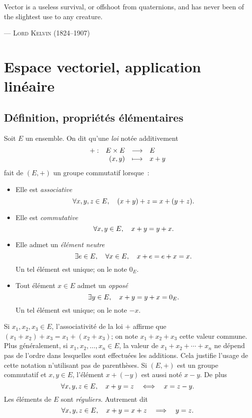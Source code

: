 \documentclass{magnoliaold}
\begin{document}
\setlength{}
\epigraph{\og Vector is a useless survival, or offshoot from quaternions, and has never been of the slightest use to any creature. \fg}{--- \textsc{Lord Kelvin (1824--1907)}}
\magtoc

\section{Espace vectoriel, application linéaire}
\subsection{Définition, propriétés élémentaires}

\begin{definition}
Soit $E$ un ensemble. On dit qu'une \emph{loi} notée additivement
\[\begin{array}[t]{lrcl} \displaystyle{+} : & \displaystyle{E\times E} & \longrightarrow & \displaystyle{E} \\ & \displaystyle{\left(x,y\right)} & \longmapsto & \displaystyle{x+y} \end{array}\]
fait de $(E,+)$ un groupe commutatif lorsque~:
\begin{itemize}
\item Elle est \emph{associative}
  \[\forall x,y,z\in E,\quad (x+y)+z=x+(y+z).\]
\item Elle est \emph{commutative}
  \[\forall x,y\in E,\quad x+y=y+x.\]
\item Elle admet un \emph{élément neutre}~
  \[\exists e\in E,\quad \forall x\in E ,\quad x+e=e+x=x.\]
  Un tel élément est unique; on le note $0_E$.
\item Tout élément $x\in E$ admet un \emph{opposé}~
\[\exists y\in E,\quad x+y=y+x=0_E.\]
Un tel élément est unique; on le note $-x$.
\end{itemize}
\end{definition}

\begin{remarques}
\remarque Si $x_1,x_2,x_3\in E$, l'associativité de la loi $+$ affirme que
  $(x_1+x_2)+x_3=x_1+(x_2+x_3)$; on note $x_1+x_2+x_3$ cette valeur commune. Plus
  généralement, si $x_1,x_2,\ldots,x_n\in E$, la valeur de $x_1+x_2+\cdots+x_n$ ne dépend
  pas de l'ordre dans lesquelles sont effectuées les additions. Cela justifie l'usage de
  cette notation n'utilisant pas de parenthèses.
\remarque Si $(E,+)$ est un groupe commutatif et $x,y\in E$, l'élément $x+(-y)$ est aussi
  noté $x-y$. De plus
  \[\forall x,y,z\in E,\quad x+y=z \quad\Longleftrightarrow\quad x = z-y.\]
\remarque Les éléments de $E$ sont \emph{réguliers}. Autrement dit
  \[\forall x,y,z\in E,\quad x+y=x+z \quad\Longrightarrow\quad  y=z.\]
\end{remarques}
\end{document}
